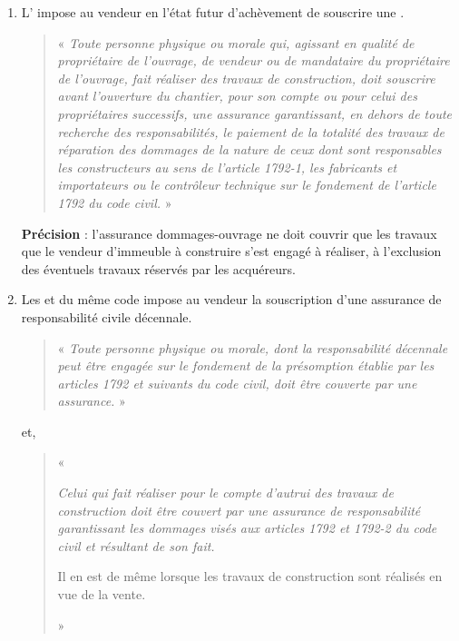 				\begin{enumerate}
					\item L’  impose au vendeur en l’état futur d’achèvement de souscrire une \ado.
					\begin{quote}
						« {\itshape Toute personne physique ou morale qui, agissant en qualité de propriétaire de l'ouvrage, de vendeur ou de mandataire du propriétaire de l'ouvrage, fait réaliser des travaux de construction, doit souscrire avant l'ouverture du chantier, pour son compte ou pour celui des propriétaires successifs, une assurance garantissant, en dehors de toute recherche des responsabilités, le paiement de la totalité des travaux de réparation des dommages de la nature de ceux dont sont responsables les constructeurs au sens de l'article 1792-1, les fabricants et importateurs ou le contrôleur technique sur le fondement de l'article 1792 du code civil.} »

					\end{quote}

					\textbf{Précision} : l’assurance dommages-ouvrage ne doit couvrir que les travaux que le vendeur d’immeuble à construire s’est engagé à réaliser, à l’exclusion des éventuels travaux réservés par les acquéreurs.


					\item Les  et  du même code impose au vendeur la souscription d’une assurance de responsabilité civile décennale.

					\begin{quote}
						« {\itshape Toute personne physique ou morale, dont la responsabilité décennale peut être engagée sur le fondement de la présomption établie par les articles 1792 et suivants du code civil, doit être couverte par une assurance.} »

					\end{quote}

					et,

					\begin{quote}
						« {\itshape Celui qui fait réaliser pour le compte d'autrui des travaux de construction doit être couvert par une assurance de responsabilité garantissant les dommages visés aux articles 1792 et 1792-2 du code civil et résultant de son fait.

						Il en est de même lorsque les travaux de construction sont réalisés en vue de la vente. }»
					\end{quote}

				\end{enumerate}

